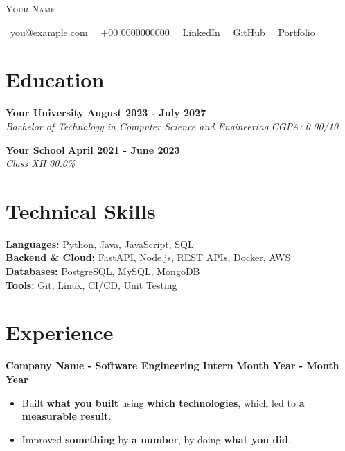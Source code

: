 \documentclass[11pt,a4paper]{article}
\begin{document}
\begin{center}
    {\Huge \scshape Your Name}
\end{center}

\vspace{-2pt}
\noindent
\parbox{\textwidth}{\centering\small
\href{mailto:you@example.com}{\faEnvelope\ \underline{you@example.com}} \,
\faPhone\ \underline{+00 0000000000} \,
\href{https://www.linkedin.com/in/your-profile/}{\faLinkedin\ \underline{LinkedIn}} \,
\href{https://github.com/your-username}{\faGithub\ \underline{GitHub}} \,
\href{https://your-portfolio.example.com/}{\faGlobe\ \underline{Portfolio}}
}

\vspace{4pt}

\section{Education}
\textbf{Your University} \hfill \textbf{August 2023 - July 2027}\\
\textit{Bachelor of Technology in Computer Science and Engineering} \hfill \textit{CGPA: 0.00/10}

\textbf{Your School} \hfill \textbf{April 2021 - June 2023}\\
\textit{Class XII} \hfill \textit{00.0\%}

\section{Technical Skills}
\textbf{Languages:} Python, Java, JavaScript, SQL\\
\textbf{Backend \& Cloud:} FastAPI, Node.js, REST APIs, Docker, AWS\\
\textbf{Databases:} PostgreSQL, MySQL, MongoDB\\
\textbf{Tools:} Git, Linux, CI/CD, Unit Testing

\section{Experience}
\textbf{Company Name - Software Engineering Intern} \hfill \textbf{Month Year - Month Year}
\begin{itemize}
    \item Built \textbf{what you built} using \textbf{which technologies}, which led to \textbf{a measurable result}.
    \item Improved \textbf{something} by \textbf{a number}, by doing \textbf{what you did}.
\end{itemize}
\end{document}
